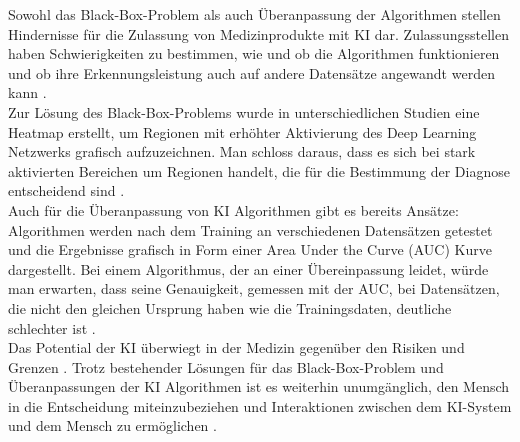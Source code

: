 Sowohl das Black-Box-Problem als auch Überanpassung der Algorithmen stellen Hindernisse für die Zulassung von Medizinprodukte mit KI dar. Zulassungsstellen haben Schwierigkeiten zu bestimmen, wie und ob die Algorithmen funktionieren und ob ihre Erkennungsleistung auch auf andere Datensätze angewandt werden kann \cite{AI_where_are_we_now}.\\
Zur Lösung des Black-Box-Problems wurde in unterschiedlichen Studien eine Heatmap erstellt, um Regionen mit erhöhter Aktivierung des Deep Learning Netzwerks grafisch aufzuzeichnen. Man schloss daraus, dass es sich bei stark aktivierten Bereichen um Regionen handelt, die für die Bestimmung der Diagnose entscheidend sind \cite{AI_where_are_we_now}.\\
Auch für die Überanpassung von KI Algorithmen gibt es bereits Ansätze: Algorithmen werden nach dem Training an verschiedenen Datensätzen getestet\cite{AI_where_are_we_now} und die Ergebnisse grafisch in Form einer Area Under the Curve (AUC) Kurve dargestellt. Bei einem Algorithmus, der an einer Übereinpassung leidet, würde man erwarten, dass seine Genauigkeit, gemessen mit der AUC, bei Datensätzen, die nicht den gleichen Ursprung haben wie die Trainingsdaten, deutliche schlechter ist \cite{AI_where_are_we_now}.\\
Das Potential der KI überwiegt in der Medizin  gegenüber den Risiken und Grenzen  \cite{Chapter_14}. Trotz bestehender Lösungen für das Black-Box-Problem und Überanpassungen der KI Algorithmen ist es weiterhin unumgänglich, den Mensch in die Entscheidung miteinzubeziehen und Interaktionen zwischen dem KI-System und dem Mensch zu ermöglichen
\cite{AI_where_are_we_now}.
